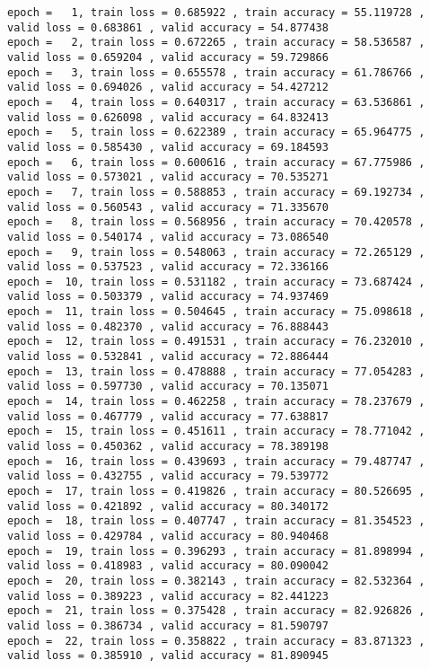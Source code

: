 \documentclass[11pt]{article}
\begin{document}
    \begin{Verbatim}[commandchars=\\\{\}]
epoch =   1, train loss = 0.685922 , train accuracy = 55.119728 , valid loss = 0.683861 , valid accuracy = 54.877438
epoch =   2, train loss = 0.672265 , train accuracy = 58.536587 , valid loss = 0.659204 , valid accuracy = 59.729866
epoch =   3, train loss = 0.655578 , train accuracy = 61.786766 , valid loss = 0.694026 , valid accuracy = 54.427212
epoch =   4, train loss = 0.640317 , train accuracy = 63.536861 , valid loss = 0.626098 , valid accuracy = 64.832413
epoch =   5, train loss = 0.622389 , train accuracy = 65.964775 , valid loss = 0.585430 , valid accuracy = 69.184593
epoch =   6, train loss = 0.600616 , train accuracy = 67.775986 , valid loss = 0.573021 , valid accuracy = 70.535271
epoch =   7, train loss = 0.588853 , train accuracy = 69.192734 , valid loss = 0.560543 , valid accuracy = 71.335670
epoch =   8, train loss = 0.568956 , train accuracy = 70.420578 , valid loss = 0.540174 , valid accuracy = 73.086540
epoch =   9, train loss = 0.548063 , train accuracy = 72.265129 , valid loss = 0.537523 , valid accuracy = 72.336166
epoch =  10, train loss = 0.531182 , train accuracy = 73.687424 , valid loss = 0.503379 , valid accuracy = 74.937469
epoch =  11, train loss = 0.504645 , train accuracy = 75.098618 , valid loss = 0.482370 , valid accuracy = 76.888443
epoch =  12, train loss = 0.491531 , train accuracy = 76.232010 , valid loss = 0.532841 , valid accuracy = 72.886444
epoch =  13, train loss = 0.478888 , train accuracy = 77.054283 , valid loss = 0.597730 , valid accuracy = 70.135071
epoch =  14, train loss = 0.462258 , train accuracy = 78.237679 , valid loss = 0.467779 , valid accuracy = 77.638817
epoch =  15, train loss = 0.451611 , train accuracy = 78.771042 , valid loss = 0.450362 , valid accuracy = 78.389198
epoch =  16, train loss = 0.439693 , train accuracy = 79.487747 , valid loss = 0.432755 , valid accuracy = 79.539772
epoch =  17, train loss = 0.419826 , train accuracy = 80.526695 , valid loss = 0.421892 , valid accuracy = 80.340172
epoch =  18, train loss = 0.407747 , train accuracy = 81.354523 , valid loss = 0.429784 , valid accuracy = 80.940468
epoch =  19, train loss = 0.396293 , train accuracy = 81.898994 , valid loss = 0.418983 , valid accuracy = 80.090042
epoch =  20, train loss = 0.382143 , train accuracy = 82.532364 , valid loss = 0.389223 , valid accuracy = 82.441223
epoch =  21, train loss = 0.375428 , train accuracy = 82.926826 , valid loss = 0.386734 , valid accuracy = 81.590797
epoch =  22, train loss = 0.358822 , train accuracy = 83.871323 , valid loss = 0.385910 , valid accuracy = 81.890945

\end{Verbatim}
\end{document}
